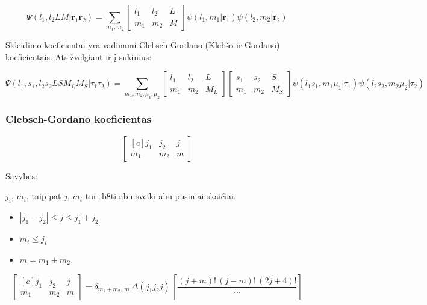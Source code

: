 \begin{equation*}
    \Psi(l_1, l_2 LM|\bm{r}_1 \bm{r}_2) = \sum_{m_1, m_2} 
    \begin{bmatrix*}
        l_1 & l_2 & L\\
        m_1 & m_2 & M
    \end{bmatrix*}
    \psi (l_1, m_1 | \bm{r}_1) \psi (l_2, m_2 | \bm{r}_2)
\end{equation*}

Skleidimo koeficientai yra vadinami Clebsch-Gordano (Klebšo ir Gordano) koeficientais.
Atsižvelgiant ir į sukinius:

\begin{equation*}
    \Psi(l_1, s_1, l_2 s_2 L S M_L M_S |\tau_1 \tau_2) = \sum_{m_1, m_2, \mu_1, \mu_2} 
    \begin{bmatrix*}
        l_1 & l_2 & L\\
        m_1 & m_2 & M_L
    \end{bmatrix*}
    \begin{bmatrix*}
        s_1 & s_2 & S\\
        m_1 & m_2 & M_S
    \end{bmatrix*}
    \psi (l_1 s_1, m_1 \mu_1 | \tau_1 ) \psi (l_2 s_2, m_2 \mu_2 | \tau_2 )
\end{equation*}

\subsubsection*{Clebsch-Gordano koeficientas}

\begin{equation*}
    \begin{bmatrix*}[c]
        j_1 & j_2 & j \\
        m_1 & m_2 & m
    \end{bmatrix*}
\end{equation*}

Savybės:

$j_i$, $m_i$, taip pat $j$, $m_i$ turi b8ti abu sveiki abu pusiniai skaičiai.

\begin{itemize}
    \item $|j_1 - j_2| \leq j \leq j_1 + j_2$
    \item $m_i \leq j_i$
    \item $m = m_1 + m_2$
\end{itemize}

\begin{equation*}
  \begin{bmatrix*}[c]
    j_1 & j_2 & j \\
    m_1 & m_2 & m
  \end{bmatrix*}
  = \delta_{m_1+m_2,\,m}\,\Delta(j_1 j_2 j)\,
  \left[\frac{(j+m)!\,(j-m)!\,(2j+4)!}{\cdots}\right]
\end{equation*}

